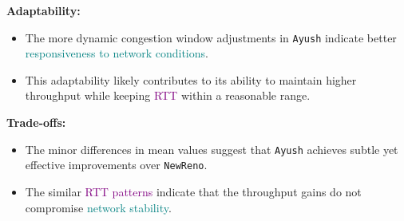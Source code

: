 \documentclass[11pt,a4paper]{article}
\begin{document}
\textbf{Adaptability:}
\begin{itemize}
    \item The more dynamic congestion window adjustments in \texttt{Ayush} indicate better \textcolor{teal}{responsiveness to network conditions}.
    \item This adaptability likely contributes to its ability to maintain higher throughput while keeping \textcolor{purple}{RTT} within a reasonable range.
\end{itemize}

\textbf{Trade-offs:}
\begin{itemize}
    \item The minor differences in mean values suggest that \texttt{Ayush} achieves subtle yet effective improvements over \texttt{NewReno}.
    \item The similar \textcolor{purple}{RTT patterns} indicate that the throughput gains do not compromise \textcolor{teal}{network stability}.
\end{itemize}
\end{document}
